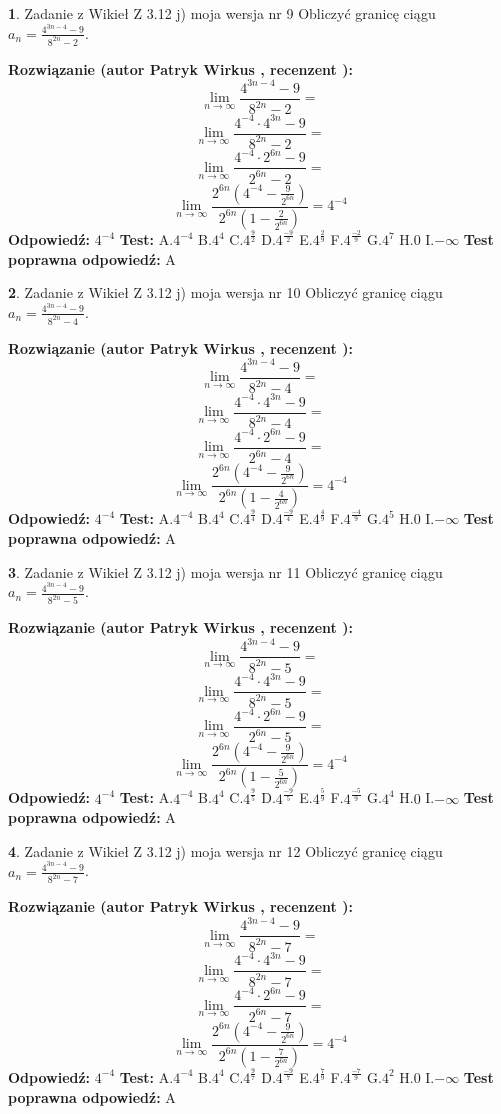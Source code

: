 \documentclass[12pt, a4paper]{article}
\theoremstyle{definition} %
\newtheorem{zad}{}
\newcommand{\zadStart}[1]{\begin{zad}#1\newline}
\newcommand{\zadStop}{\end{zad}}
\newcommand{\rozwStart}[2]{\noindent \textbf{Rozwiązanie (autor #1 , recenzent #2): }\newline}
\newcommand{\rozwStop}{\newline}
\newcommand{\odpStart}{\noindent \textbf{Odpowiedź:}\newline}
\newcommand{\odpStop}{\newline}
\newcommand{\testStart}{\noindent \textbf{Test:}\newline}
\newcommand{\testStop}{\newline}
\newcommand{\kluczStart}{\noindent \textbf{Test poprawna odpowiedź:}\newline}
\newcommand{\kluczStop}{\newline}
\begin{document}
\zadStart{Zadanie z Wikieł Z 3.12 j) moja wersja nr 9}
Obliczyć granicę ciągu $a_{n}=\frac{4^{3n-4}-9}{8^{2n}-2}$.
\zadStop
\rozwStart{Patryk Wirkus}{}
$$\lim\limits_{n\to\infty}\frac{4^{3n-4}-9}{8^{2n}-2}=$$
$$\lim\limits_{n\to\infty}\frac{4^{-4} \cdot 4^{3n}-9}{8^{2n}-2}=$$
$$\lim\limits_{n\to\infty}\frac{4^{-4} \cdot 2^{6n}-9}{2^{6n}-2}=$$
$$\lim\limits_{n\to\infty}\frac{2^{6n}(4^{-4} - \frac{9}{2^{6n}})}{2^{6n}(1-\frac{2}{2^{6n}})}= 4^{-4}$$
\rozwStop
\odpStart
$4^{-4}$
\odpStop
\testStart
A.$4^{-4}$
B.$4^{4}$
C.$4^{\frac{9}{2}}$
D.$4^{\frac{-9}{2}}$
E.$4^{\frac{2}{9}}$
F.$4^{\frac{-2}{9}}$
G.$4^{7}$
H.$0$
I.$-\infty$
\testStop
\kluczStart
A
\kluczStop



\zadStart{Zadanie z Wikieł Z 3.12 j) moja wersja nr 10}
Obliczyć granicę ciągu $a_{n}=\frac{4^{3n-4}-9}{8^{2n}-4}$.
\zadStop
\rozwStart{Patryk Wirkus}{}
$$\lim\limits_{n\to\infty}\frac{4^{3n-4}-9}{8^{2n}-4}=$$
$$\lim\limits_{n\to\infty}\frac{4^{-4} \cdot 4^{3n}-9}{8^{2n}-4}=$$
$$\lim\limits_{n\to\infty}\frac{4^{-4} \cdot 2^{6n}-9}{2^{6n}-4}=$$
$$\lim\limits_{n\to\infty}\frac{2^{6n}(4^{-4} - \frac{9}{2^{6n}})}{2^{6n}(1-\frac{4}{2^{6n}})}= 4^{-4}$$
\rozwStop
\odpStart
$4^{-4}$
\odpStop
\testStart
A.$4^{-4}$
B.$4^{4}$
C.$4^{\frac{9}{4}}$
D.$4^{\frac{-9}{4}}$
E.$4^{\frac{4}{9}}$
F.$4^{\frac{-4}{9}}$
G.$4^{5}$
H.$0$
I.$-\infty$
\testStop
\kluczStart
A
\kluczStop



\zadStart{Zadanie z Wikieł Z 3.12 j) moja wersja nr 11}
Obliczyć granicę ciągu $a_{n}=\frac{4^{3n-4}-9}{8^{2n}-5}$.
\zadStop
\rozwStart{Patryk Wirkus}{}
$$\lim\limits_{n\to\infty}\frac{4^{3n-4}-9}{8^{2n}-5}=$$
$$\lim\limits_{n\to\infty}\frac{4^{-4} \cdot 4^{3n}-9}{8^{2n}-5}=$$
$$\lim\limits_{n\to\infty}\frac{4^{-4} \cdot 2^{6n}-9}{2^{6n}-5}=$$
$$\lim\limits_{n\to\infty}\frac{2^{6n}(4^{-4} - \frac{9}{2^{6n}})}{2^{6n}(1-\frac{5}{2^{6n}})}= 4^{-4}$$
\rozwStop
\odpStart
$4^{-4}$
\odpStop
\testStart
A.$4^{-4}$
B.$4^{4}$
C.$4^{\frac{9}{5}}$
D.$4^{\frac{-9}{5}}$
E.$4^{\frac{5}{9}}$
F.$4^{\frac{-5}{9}}$
G.$4^{4}$
H.$0$
I.$-\infty$
\testStop
\kluczStart
A
\kluczStop



\zadStart{Zadanie z Wikieł Z 3.12 j) moja wersja nr 12}
Obliczyć granicę ciągu $a_{n}=\frac{4^{3n-4}-9}{8^{2n}-7}$.
\zadStop
\rozwStart{Patryk Wirkus}{}
$$\lim\limits_{n\to\infty}\frac{4^{3n-4}-9}{8^{2n}-7}=$$
$$\lim\limits_{n\to\infty}\frac{4^{-4} \cdot 4^{3n}-9}{8^{2n}-7}=$$
$$\lim\limits_{n\to\infty}\frac{4^{-4} \cdot 2^{6n}-9}{2^{6n}-7}=$$
$$\lim\limits_{n\to\infty}\frac{2^{6n}(4^{-4} - \frac{9}{2^{6n}})}{2^{6n}(1-\frac{7}{2^{6n}})}= 4^{-4}$$
\rozwStop
\odpStart
$4^{-4}$
\odpStop
\testStart
A.$4^{-4}$
B.$4^{4}$
C.$4^{\frac{9}{7}}$
D.$4^{\frac{-9}{7}}$
E.$4^{\frac{7}{9}}$
F.$4^{\frac{-7}{9}}$
G.$4^{2}$
H.$0$
I.$-\infty$
\testStop
\kluczStart
A
\kluczStop
\end{document}
